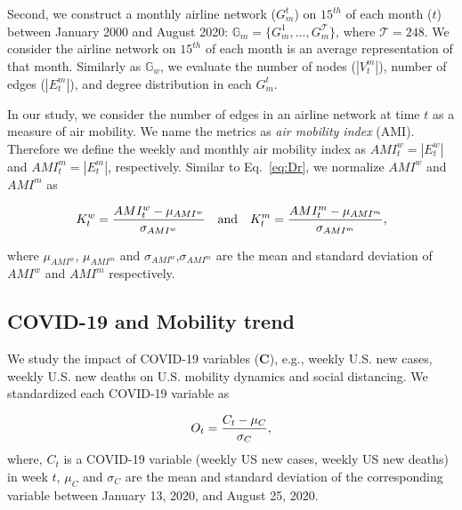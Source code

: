 \documentclass[review]{elsarticle}
\begin{document}


Second, we construct a monthly airline network ($G^t_m$) on $15^{th}$ of each month ($t$) between January 2000 and August 2020: $\mathbb{G}_m = \{{G}^{1}_m, \ldots, {G}^{\mathcal{T}}_m\}$, where $\mathcal{T}=248$. We consider 
the airline network on $15^{th}$ of each month is an average representation of that month. Similarly as $\mathbb{G}_w$, we evaluate the number of nodes ($|V^m_t|$), number of edges ($|E^m_t|$), and degree distribution in each $G^t_m$.


In our study, we consider the number of edges in an airline network at time $t$ as a measure of air mobility. 
We name the metrics 
as \textit{air mobility index} (AMI). Therefore we define the weekly and monthly air mobility index as $AMI^w_t = |E^w_t|$ and $AMI^m_t = |E^m_t|$, respectively. 
Similar to Eq.~\ref{eq:Dr}, we normalize $AMI^w$  and $AMI^m$ as 

\begin{eqnarray}\label{eq:GT}
K^w_t= {{AMI^w_t-  \mu_{AMI^w}} \over{\sigma_{AMI^w}}}   \quad\mathrm{and}\quad  K^m_t= {{AMI^m_t-  \mu_{AMI^m}} \over{\sigma_{AMI^m}}},
\end{eqnarray}

where $\mu_{AMI^w}$, $\mu_{AMI^m}$ and $\sigma_{AMI^w}$,$\sigma_{AMI^m}$ are the mean and standard deviation of $AMI^w$ and  $AMI^m$ respectively.


\subsection{COVID-19 and Mobility trend}

We study the impact of COVID-19 variables ($\textbf{C}$), e.g., weekly U.S. new cases, weekly U.S. new deaths on U.S. mobility dynamics and social distancing. We standardized each COVID-19 variable as

\begin{eqnarray}\label{eq:CVt}
O_t= {{C_t-  \mu_C} \over{\sigma_{C}}},
\end{eqnarray}
where, $C_t$ is a COVID-19 variable (weekly US new cases, weekly US new deaths) in week $t$,  $\mu_C$ and $\sigma_{C}$ are the mean and standard deviation of the corresponding variable between January 13, 2020, and August 25, 2020.
\end{document}
